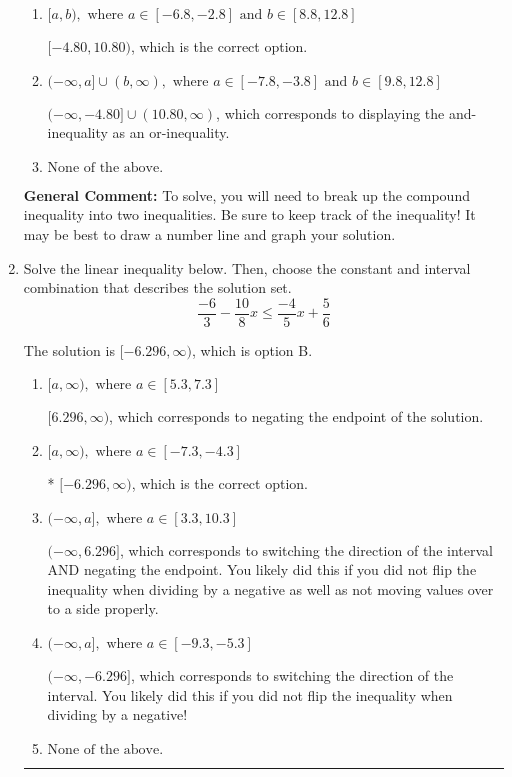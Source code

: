 \documentclass{extbook}[14pt]
\newcommand{\litem}[1]{\item #1

\rule{\textwidth}{0.4pt}}
\begin{document}
\begin{enumerate}
{\begin{enumerate}[label=\Alph*.]
$(-4.80, 10.80]$, which corresponds to flipping the inequality.
\item \( [a, b), \text{ where } a \in [-6.8, -2.8] \text{ and } b \in [8.8, 12.8] \)

$[-4.80, 10.80)$, which is the correct option.
\item \( (-\infty, a] \cup (b, \infty), \text{ where } a \in [-7.8, -3.8] \text{ and } b \in [9.8, 12.8] \)

$(-\infty, -4.80] \cup (10.80, \infty)$, which corresponds to displaying the and-inequality as an or-inequality.
\item \( \text{None of the above.} \)


\end{enumerate}

\textbf{General Comment:} To solve, you will need to break up the compound inequality into two inequalities. Be sure to keep track of the inequality! It may be best to draw a number line and graph your solution.
}
\litem{
Solve the linear inequality below. Then, choose the constant and interval combination that describes the solution set.
\[ \frac{-6}{3} - \frac{10}{8} x \leq \frac{-4}{5} x + \frac{5}{6} \]

The solution is \( [-6.296, \infty) \), which is option B.\begin{enumerate}[label=\Alph*.]
\item \( [a, \infty), \text{ where } a \in [5.3, 7.3] \)

 $[6.296, \infty)$, which corresponds to negating the endpoint of the solution.
\item \( [a, \infty), \text{ where } a \in [-7.3, -4.3] \)

* $[-6.296, \infty)$, which is the correct option.
\item \( (-\infty, a], \text{ where } a \in [3.3, 10.3] \)

 $(-\infty, 6.296]$, which corresponds to switching the direction of the interval AND negating the endpoint. You likely did this if you did not flip the inequality when dividing by a negative as well as not moving values over to a side properly.
\item \( (-\infty, a], \text{ where } a \in [-9.3, -5.3] \)

 $(-\infty, -6.296]$, which corresponds to switching the direction of the interval. You likely did this if you did not flip the inequality when dividing by a negative!
\item \( \text{None of the above}. \)


\end{enumerate}}
\end{enumerate}
\end{document}
